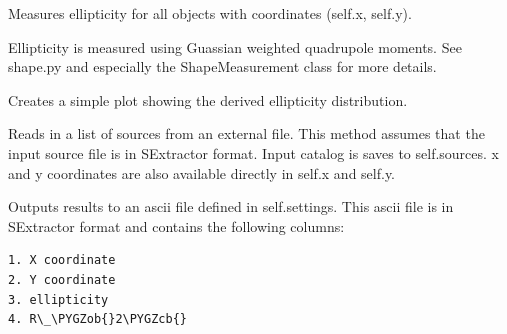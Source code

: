 \documentclass[a4paper,11pt,english]{sphinxmanual}
\def\PYGZob{\char`\{}
\def\PYGZcb{\char`\}}
\begin{document}
\begin{fulllineitems}
\begin{fulllineitems}
\end{fulllineitems}


\begin{fulllineitems}
\label{analysis:analysis.analyse.analyseVISdata.measureEllipticity}
Measures ellipticity for all objects with coordinates (self.x, self.y).

Ellipticity is measured using Guassian weighted quadrupole moments.
See shape.py and especially the ShapeMeasurement class for more details.

\end{fulllineitems}


\begin{fulllineitems}
\label{analysis:analysis.analyse.analyseVISdata.plotEllipticityDistribution}
Creates a simple plot showing the derived ellipticity distribution.

\end{fulllineitems}


\begin{fulllineitems}
\label{analysis:analysis.analyse.analyseVISdata.readSources}
Reads in a list of sources from an external file. This method assumes
that the input source file is in SExtractor format. Input catalog is
saves to self.sources. x and y coordinates are also available directly in self.x and self.y.

\end{fulllineitems}


\begin{fulllineitems}
\label{analysis:analysis.analyse.analyseVISdata.writeResults}
Outputs results to an ascii file defined in self.settings. This ascii file
is in SExtractor format and contains the following columns:

\begin{Verbatim}[commandchars=\\\{\}]
1. X coordinate
2. Y coordinate
3. ellipticity
4. R\_\PYGZob{}2\PYGZcb{}
\end{Verbatim}

\end{fulllineitems}


\end{fulllineitems}
\end{document}
